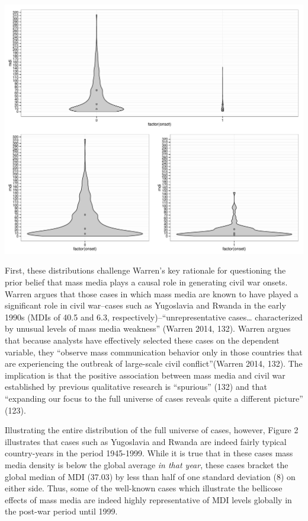 \documentclass[11pt,article,oneside]{memoir}
\makeatletter
\def\maxwidth{\ifdim\Gin@nat@width>\linewidth\linewidth
\else\Gin@nat@width\fi}
\let\Oldincludegraphics\includegraphics
\renewcommand{\includegraphics}[1]{\Oldincludegraphics[width=\maxwidth]{#1}}
\makeatother
\begin{document}
\clearpage
\includegraphics{figure/violinplot.pdf} \clearpage

First, these distributions challenge Warren's key rationale for
questioning the prior belief that mass media plays a causal role in
generating civil war onsets. Warren argues that those cases in which
mass media are known to have played a significant role in civil
war--cases such as Yugoslavia and Rwanda in the early 1990s (MDIs of
40.5 and 6.3, respectively)--``unrepresentative cases\ldots{}
characterized by unusual levels of mass media weakness'' (Warren 2014,
132). Warren argues that because analysts have effectively selected
these cases on the dependent variable, they ``observe mass communication
behavior only in those countries that are experiencing the outbreak of
large-scale civil conflict''(Warren 2014, 132). The implication is that
the positive association between mass media and civil war established by
previous qualitative research is ``spurious'' (132) and that ``expanding
our focus to the full universe of cases reveals quite a different
picture'' (123).

Illustrating the entire distribution of the full universe of cases,
however, Figure 2 illustrates that cases such as Yugoslavia and Rwanda
are indeed fairly typical country-years in the period 1945-1999. While
it is true that in these cases mass media density is below the global
average \emph{in that year}, these cases bracket the global median of
MDI (37.03) by less than half of one standard deviation (8) on either
side. Thus, some of the well-known cases which illustrate the bellicose
effects of mass media are indeed highly representative of MDI levels
globally in the post-war period until 1999.
\end{document}

